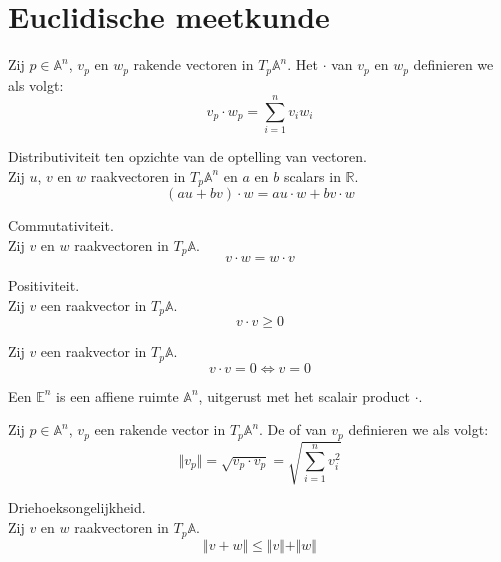 \documentclass[main.tex]{subfiles}
\begin{document}
\chapter{Euclidische meetkunde}
\label{cha:euclidische-meetkunde}

\begin{de}
  Zij $p\in\mathbb{A}^{n}$, $v_{p}$ en $w_{p}$ rakende vectoren in $T_{p}\mathbb{A}^{n}$.
  Het  $\cdot$ van $v_{p}$ en $w_{p}$ definieren we als volgt:
  \[ v_{p} \cdot w_{p} = \sum_{i=1}^{n}v_{i}w_{i} \]
\end{de}

\begin{ei}
  Distributiviteit ten opzichte van de optelling van vectoren.\\
  Zij $u$, $v$ en $w$ raakvectoren in $T_{p}\mathbb{A}^{n}$ en $a$ en $b$ scalars in $\mathbb{R}$.
  \[ (au + bv) \cdot w = au\cdot w + bv \cdot w \]
\end{ei}

\begin{ei}
  Commutativiteit.\\
  Zij $v$ en $w$ raakvectoren in $T_{p}\mathbb{A}$.
  \[ v\cdot w = w\cdot v\]
\end{ei}

\begin{ei}
  Positiviteit.\\
  Zij $v$ een raakvector in $T_{p}\mathbb{A}$.
  \[ v \cdot v \ge 0 \]
\end{ei}

\begin{ei}
  Zij $v$ een raakvector in $T_{p}\mathbb{A}$.
  \[ v \cdot v = 0 \Leftrightarrow v = 0 \]
\end{ei}

\begin{de}
  Een  $\mathbb{E}^{n}$ is een affiene ruimte $\mathbb{A}^{n}$, uitgerust met het scalair product $\cdot$.
\end{de}

\begin{de}
  Zij $p\in\mathbb{A}^{n}$, $v_{p}$ een rakende vector in $T_{p}\mathbb{A}^{n}$.
  De  of  van $v_{p}$ definieren we als volgt:
  \[ \Vert v_{p} \Vert = \sqrt{v_{p} \cdot v_{p}} = \sqrt{\sum_{i=1}^{n}v_{i}^{2}} \]
\end{de}

\begin{ei}
  Driehoeksongelijkheid.\\
  Zij $v$ en $w$ raakvectoren in $T_{p}\mathbb{A}$.
  \[ \Vert v + w \Vert \le \Vert v \Vert + \Vert w \Vert \]
\end{ei}
\end{document}
